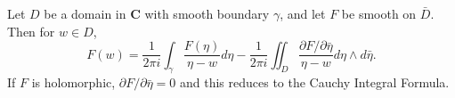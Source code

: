 Let $D$ be a domain in $\mathbf{C}$ with smooth boundary $\gamma$, and let $F$ be smooth on $\bar{D}$. Then for $w \in D$,
$$F(w) = \frac{1}{2\pi i} \int_\gamma \frac{F(\eta)}{\eta - w} d\eta - \frac{1}{2\pi i} \iint_D \frac{\partial F / \partial \bar{\eta}}{\eta - w} d\eta \wedge d\bar{\eta}.$$
If $F$ is holomorphic, $\partial F/\partial \bar{\eta} = 0$ and this reduces to the Cauchy Integral Formula.
